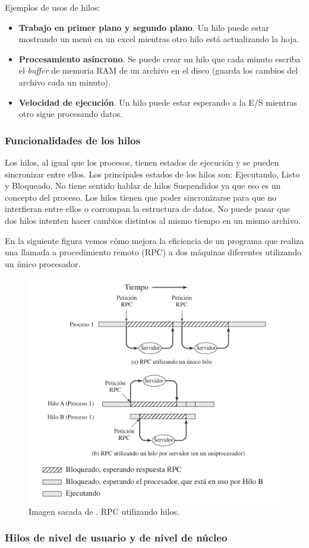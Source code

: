 \documentclass[12pt]{article}
\begin{document}
  Ejemplos de usos de hilos:
  \begin{itemize}
    \item \textbf{Trabajo en primer plano y segundo plano}. Un hilo puede estar mostrando un menú en un excel mientras otro hilo está actualizando la hoja.

    \item \textbf{Procesamiento asíncrono}. Se puede crear un hilo que cada minuto escriba el \textit{buffer} de memoria RAM de un archivo en el disco (guarda los cambios del archivo cada un minuto).

    \item \textbf{Velocidad de ejecución}. Un hilo puede estar esperando a la E/S mientras otro sigue procesando datos.
  \end{itemize}

  \subsubsection{Funcionalidades de los hilos}
  Los hilos, al igual que los procesos, tienen estados de ejecución y se pueden sincronizar entre ellos. Los principales estados de los hilos son: Ejecutando, Listo y Bloqueado. No tiene sentido hablar de hilos Suspendidos ya que eso es un concepto del proceso. Los hilos tienen que poder sincronizarse para que no interfieran entre ellos o corrompan la estructura de datos. No puede pasar que dos hilos intenten hacer cambios distintos al mismo tiempo en un mismo archivo.

  En la siguiente figura vemos cómo mejora la eficiencia de un programa que realiza una llamada a procedimiento remoto (RPC) a dos máquinas diferentes utilizando un único procesador.

  \begin{figure}[H]
    \centering
    \includegraphics[width=0.7\linewidth]{imagenes/mono-vs-multihilo-2.png}
    \caption{Imagen sacada de \parencite{sostallings}. RPC utilizando hilos.}
    \label{fig:mono-vs-mulithilo-2}
  \end{figure}

  \subsubsection{Hilos de nivel de usuario y de nivel de núcleo}








  \newpage
  \printbibliography
\end{document}

